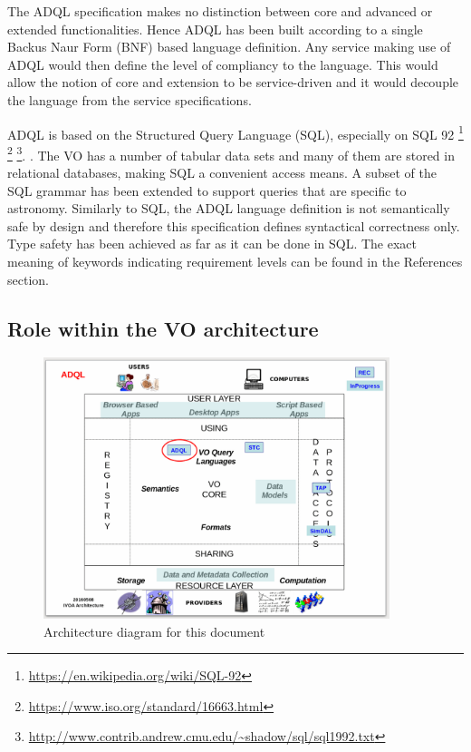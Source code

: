 \documentclass[11pt,a4paper]{ivoa}
\begin{document}
The ADQL specification makes no distinction between core and advanced or
extended functionalities. Hence ADQL has been built according to a single
Backus Naur Form (BNF) based language definition. Any service making use of ADQL would
then define the level of compliancy to the language. This would allow the
notion of core and extension to be service-driven and it would decouple the
language from the service specifications.

ADQL is based on the Structured Query Language (SQL), especially on SQL 92
\footnote{\url{https://en.wikipedia.org/wiki/SQL-92}}
\footnote{\url{https://www.iso.org/standard/16663.html}}
\footnote{\url{http://www.contrib.andrew.cmu.edu/~shadow/sql/sql1992.txt}}.
.
The VO has a number of tabular data sets and many of them are stored in relational
databases, making SQL a convenient access means. A subset of the SQL grammar
has been extended to support queries that are specific to astronomy. Similarly
to SQL, the ADQL language definition is not semantically safe by design and
therefore this specification defines syntactical correctness only. Type safety
has been achieved as far as it can be done in SQL. The exact meaning of keywords
indicating requirement levels can be found in the References section.


\clearpage
\subsection{Role within the VO architecture}
\label{sec:role}

\begin{figure}
\centering
\includegraphics[width=0.9\textwidth]{ADQL-archdiag.png}
\caption{Architecture diagram for this document}
\label{fig:archdiag}
\end{figure}
\end{document}
